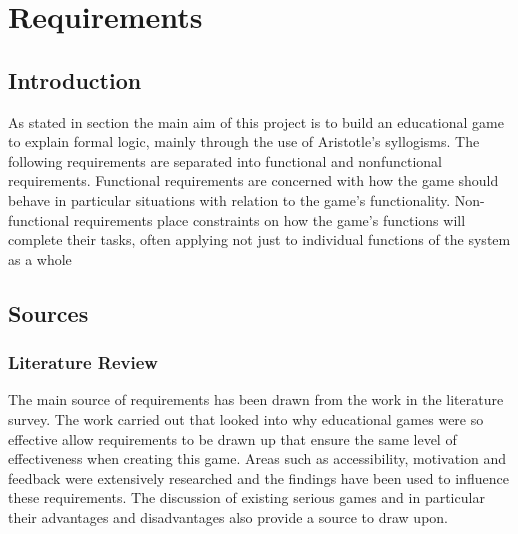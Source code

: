 \documentclass[12pt,a4paper]{report}
\begin{document}
\chapter{Requirements}
\section{Introduction}
As stated in section the main aim of this project is to build an educational game to explain formal logic, mainly through the use of Aristotle's syllogisms. The following requirements are separated into functional and nonfunctional requirements. Functional requirements are concerned with how the game should behave in particular situations with relation to the game's functionality. 
Non-functional requirements place constraints on how the game's functions will complete their tasks, often applying not just to individual functions of the system as a whole

\section{Sources}
\subsection{Literature Review}
The main source of requirements has been drawn from the work in the literature survey. The work carried out that looked into why educational games were so effective allow requirements to be drawn up that ensure the same level of effectiveness when creating this game. Areas such as accessibility, motivation and feedback were extensively researched and the findings have been used to influence these requirements. The discussion of existing serious games and in particular their advantages and disadvantages also provide a source to draw upon.
\end{document}
